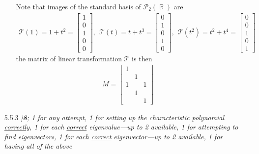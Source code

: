 \documentclass{amsart}
\theoremstyle{definition}
\theoremstyle{definition}
\DeclareMathOperator{\R}{\mathbb{R}}
\DeclareMathOperator{\1}{\mathbbm{1}}
\newcommand{\Tau}{\mathcal{T}}
\newcommand{\polyn}[2]{\mathcal{P}_{#1}(#2)}
\begin{document}
\begin{enumerate}[itemsep = 2mm]
\begin{enumerate}[label=(\alph*)]
			Note that images of the standard basis of $\polyn{2}{\R}$ are
			\begin{align*}
			\Tau(1) = 1 + t^2 = \begin{bmatrix}
			1 \\ 0 \\ 1 \\ 0 \\ 0
			\end{bmatrix}, \: \:
			\Tau(t) = t + t^3 = \begin{bmatrix}
			0 \\ 1 \\ 0 \\ 1 \\ 0
			\end{bmatrix}, \: \:
			\Tau(t^2) = t^2 + t^4 = \begin{bmatrix}
			0 \\ 0 \\ 1 \\ 0 \\ 1 
			\end{bmatrix} 
			\end{align*}
			the matrix of linear transformation $\Tau$ is then
			\begin{align*}
			M = \begin{bmatrix}
			1 & & \\ & 1 & \\ 1 & & 1 \\ & 1 & \\ & & 1
			\end{bmatrix}
			\end{align*}
		\end{enumerate}
		
		
		\item[5.5.3] \textit{[\textbf{8}; 1 for any attempt, 1 for setting up the characteristic polynomial \uline{correctly}, 1 for each \uline{correct} eigenvalue---up to 2 available, 1 for attempting to find eigenvectors, 1 for each \uline{correct} eigenvector---up to 2 available, 1 for having all of the above}
		

\end{enumerate}
\end{document}
